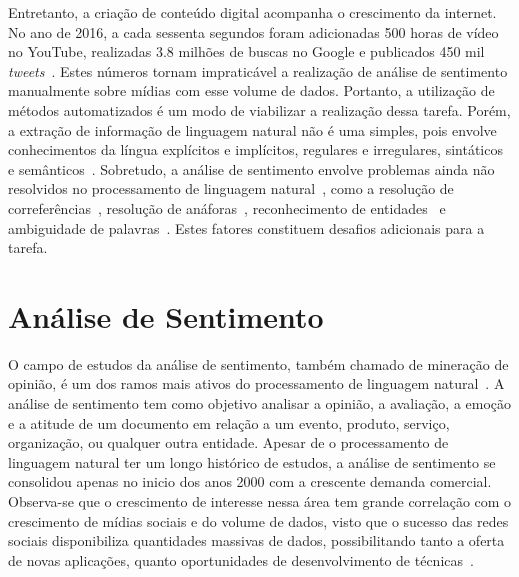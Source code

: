 Entretanto, a criação de conteúdo digital acompanha o crescimento da internet.
No ano de 2016, a cada sessenta segundos foram adicionadas 500 horas de vídeo no YouTube, realizadas 3.8 milhões de buscas
no Google e publicados 450 mil \textit{tweets}~\cite{smartinsights}.
Estes números tornam impraticável a realização de análise de sentimento manualmente sobre mídias com esse volume de
dados.
Portanto, a utilização de métodos automatizados é um modo de viabilizar a realização dessa tarefa.
Porém, a extração de informação de linguagem natural não é uma simples, pois envolve conhecimentos da língua explícitos
e implícitos, regulares e irregulares, sintáticos e semânticos~\cite{cambria13}.
Sobretudo, a análise de sentimento envolve problemas ainda não resolvidos no processamento de linguagem
natural~\cite{cambria13}, como a resolução de correferências~\cite{soon01}, resolução de anáforas~\cite{lappin94},
reconhecimento de entidades~\cite{nadeau07} e ambiguidade de palavras~\cite{yarowsky95}.
Estes fatores constituem desafios adicionais para a tarefa.

\section{Análise de Sentimento}

O campo de estudos da análise de sentimento, também chamado de mineração de opinião, é um dos ramos mais ativos do
processamento de linguagem natural~\cite{liu12}.
A análise de sentimento tem como objetivo analisar a opinião, a avaliação, a emoção e a atitude de um documento em
relação a um evento, produto, serviço, organização, ou qualquer outra entidade.
Apesar de o processamento de linguagem natural ter um longo histórico de estudos, a análise de sentimento se consolidou
apenas no inicio dos anos 2000 com a crescente demanda comercial.
Observa-se que o crescimento de interesse nessa área tem grande correlação com o crescimento de mídias sociais e do
volume de dados, visto que o sucesso das redes sociais disponibiliza quantidades massivas de dados, possibilitando tanto
a oferta de novas aplicações, quanto oportunidades de desenvolvimento de técnicas~\cite{liu12}.

